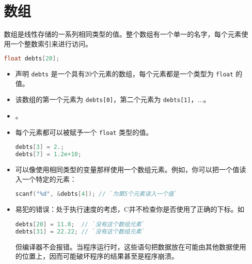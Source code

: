 \section{数组}
\begin{frame}[fragile]\ft{\secname}
数组是线性存储的一系列相同类型的值。整个数组有一个单一的名字，每个元素使用一个整数索引来进行访问。
\end{frame}

\begin{frame}[fragile]
\begin{lstlisting}[language=c,backgroundcolor=\color{red!10}]
float debts[20];
\end{lstlisting}

\begin{itemize}
\item
声明 \lstinline|debts| 是一个具有20个元素的数组，每个元素都是一个类型为 \lstinline|float| 的值。\\[0.1in]
\item
该数组的第一个元素为 \lstinline|debts[0]|，第二个元素为 \lstinline|debts[1]|，...。\\[0.1in]
\item
{}。\\[0.1in]
\item 每个元素都可以被赋予一个 \lstinline|float| 类型的值。
\begin{lstlisting}[language=c,backgroundcolor=\color{red!10}]
debts[3] = 2.;
debts[7] = 1.2e+10;
\end{lstlisting}
\end{itemize}
\end{frame}

\begin{frame}[fragile]\ft{\secname}
\begin{itemize}
\item
可以像使用相同类型的变量那样使用一个数组元素。例如，你可以把一个值读入一个特定的元素：
\begin{lstlisting}[language=c,backgroundcolor=\color{red!10}]
scanf("%d", &debts[4]); // `为第5个元素读入一个值`
\end{lstlisting} 
\end{itemize}

\end{frame}

\begin{frame}[fragile]\ft{\secname}
\begin{itemize}
\item
易犯的错误：处于执行速度的考虑，C并不检查你是否使用了正确的下标。如
\begin{lstlisting}[language=c,backgroundcolor=\color{red!10}]
debts[20] = 11.0;  // `没有这个数组元素`
debts[31] = 22.22; // `没有这个数组元素`
\end{lstlisting}
但编译器不会报错。当程序运行时，这些语句把数据放在可能由其他数据使用的位置上，因而可能破坏程序的结果甚至是程序崩溃。
\end{itemize}
\end{frame}

